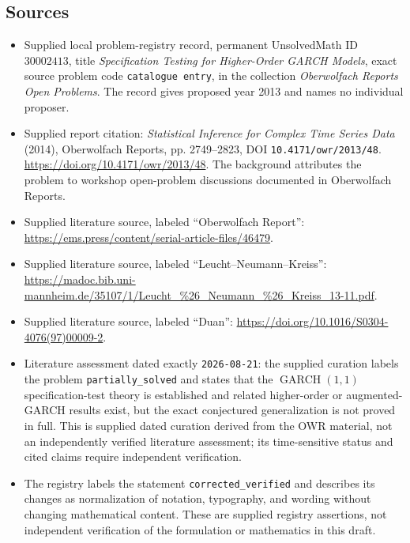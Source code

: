 \documentclass[11pt]{article}
\begin{document}
\subsection{Sources}
\begin{itemize}
\item Supplied local problem-registry record, permanent UnsolvedMath ID \(30002413\), title \emph{Specification Testing for Higher-Order GARCH Models}, exact source problem code \texttt{catalogue entry}, in the collection \emph{Oberwolfach Reports Open Problems}. The record gives proposed year 2013 and names no individual proposer.
\item Supplied report citation: \emph{Statistical Inference for Complex Time Series Data} (2014), Oberwolfach Reports, pp. 2749--2823, DOI \texttt{10.4171/owr/2013/48}. \url{https://doi.org/10.4171/owr/2013/48}. The background attributes the problem to workshop open-problem discussions documented in Oberwolfach Reports.
\item Supplied literature source, labeled ``Oberwolfach Report'': \url{https://ems.press/content/serial-article-files/46479}.
\item Supplied literature source, labeled ``Leucht--Neumann--Kreiss'': \url{https://madoc.bib.uni-mannheim.de/35107/1/Leucht_%26_Neumann_%26_Kreiss_13-11.pdf}.
\item Supplied literature source, labeled ``Duan'': \url{https://doi.org/10.1016/S0304-4076(97)00009-2}.
\item Literature assessment dated exactly \texttt{2026-08-21}: the supplied curation labels the problem \texttt{partially\_solved} and states that the \(\operatorname{GARCH}(1,1)\) specification-test theory is established and related higher-order or augmented-GARCH results exist, but the exact conjectured generalization is not proved in full. This is supplied dated curation derived from the OWR material, not an independently verified literature assessment; its time-sensitive status and cited claims require independent verification.
\item The registry labels the statement \texttt{corrected\_verified} and describes its changes as normalization of notation, typography, and wording without changing mathematical content. These are supplied registry assertions, not independent verification of the formulation or mathematics in this draft.
\end{itemize}
\end{document}
